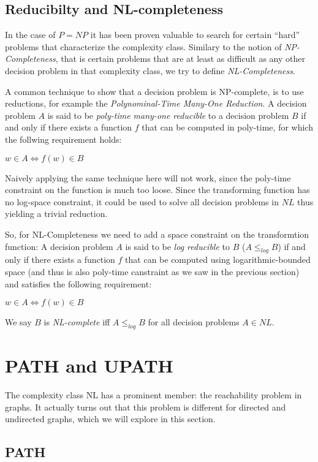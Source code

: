 \section{Reducibilty and
NL-completeness}\label{reducibilty-and-nl-completeness}

In the case of $P = NP$ it has been proven valuable to search for
certain ``hard'' problems that characterize the complexity class.
Similary to the notion of \emph{NP-Completeness}, that is certain
problems that are at least as difficult as any other decision problem in
that complexity class, we try to define \emph{NL-Completeness}.

A common technique to show that a decision problem is NP-complete, is to
use reductions, for example the \emph{Polynominal-Time Many-One
Reduction}. A decision problem $A$ is said to be \emph{poly-time
many-one reducible} to a decision problem $B$ if and only if there
exists a function $f$ that can be computed in poly-time, for which the
follwing requirement holds:

$w \in A \Leftrightarrow f(w) \in B$

Naively applying the same technique here will not work, since the
poly-time constraint on the function is much too loose. Since the
transforming function has no log-space constraint, it could be used to
solve all decision problems in $NL$ thus yielding a trivial reduction.

So, for NL-Completeness we need to add a space constraint on the
transformtion function: A decision problem $A$ is said to be \emph{log
reducible} to $B$ ($A \leq_{log} B$) if and only if there exists a
function $f$ that can be computed using logarithmic-bounded space (and
thus is also poly-time canstraint as we saw in the previous section) and
satisfies the following requirement:

$w \in A \Leftrightarrow f(w) \in B$

We say $B$ is \emph{NL-complete} iff $A \leq_{log} B$ for all decision
problems $A \in NL$.

\chapter{PATH and UPATH}\label{path-and-upath}

The complexity class NL has a prominent member: the reachability problem
in graphs. It actually turns out that this problem is different for
directed and undirected graphs, which we will explore in this section.

\section{PATH}\label{path}

